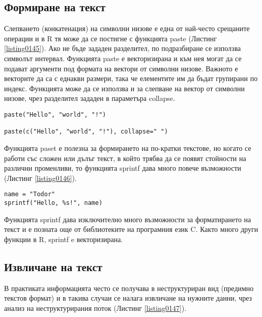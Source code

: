 \subsection{Формиране на текст}

Слепването (конкатенация) на символни низове е една от най-често срещаните операции и в R тя може да се постигне с функцията paste (Листинг \ref{listing0145}). Ако не бъде зададен разделител, по подразбиране се използва символът интервал. Функцията paste е векторизирана и към нея могат да се подават аргументи под формата на вектори от символни низове. Важното е векторите да са с еднакви размери, така че елементите им да бъдат групирани по индекс. Функцията може да се използва и за слепване на вектор от символни низове, чрез разделител зададен в параметъра collapse.

\begin{lstlisting}[caption=Конкатенация на символни низове, label=listing0145]
paste("Hello", "world", "!")

paste(c("Hello", "world", "!"), collapse=" ")
\end{lstlisting}

Функцията paset е полезна за формирането на по-кратки текстове, но когато се работи със сложен или дълъг текст, в който трябва да се появят стойности на различни променливи, то функцията sprintf дава много повече възможности (Листинг \ref{listing0146}).

\begin{lstlisting}[caption=Печатане в текст, label=listing0146]
name = "Todor"
sprintf("Hello, %s!", name)
\end{lstlisting}

Функцията sprintf дава изключително много възможности за форматирането на текст и е позната още от библиотеките на програмния език C. Както много други функции в R, sprintf e векторизирана.

\subsection{Извличане на текст}

В практиката информацията често се получава в неструктуриран вид (предимно текстов формат) и в такива случаи се налага извличане на нужните данни, чрез анализ на неструктурирания поток (Листинг \ref{listing0147}).

